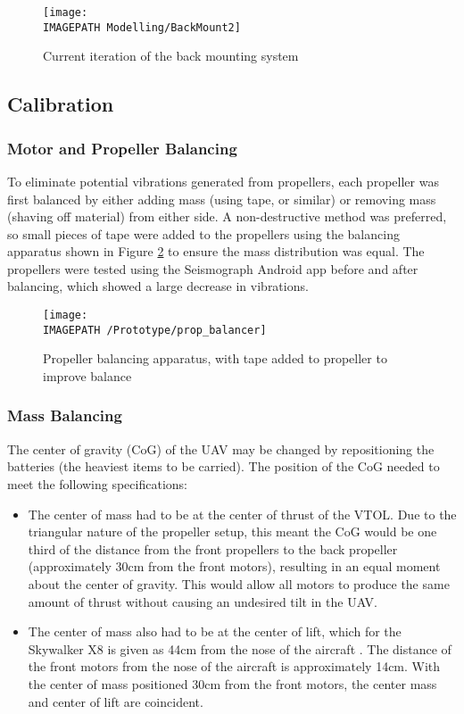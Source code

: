 \begin{figure}[!ht]
	\centering
	\texttt{[image: \\IMAGEPATH Modelling/BackMount2]}
	\caption{Current iteration of the back mounting system}
	\label{fig:designbackmount}
\end{figure}

\subsection{Calibration}
\subsubsection*{Motor and Propeller Balancing}
To eliminate potential vibrations generated from propellers, each propeller was first balanced by either adding mass (using tape, or similar) or removing mass (shaving off material) from either side. A non-destructive method was preferred, so small pieces of tape were added to the propellers using the balancing apparatus shown in Figure \ref{fig:propbalancing} to ensure the mass distribution was equal. The propellers were tested using the Seismograph Android app before and after balancing, which showed a large decrease in vibrations.
\begin{figure}[!ht]
	\centering
	\texttt{[image: \\IMAGEPATH /Prototype/prop\_balancer]}
	\caption{Propeller balancing apparatus, with tape added to propeller to improve balance}
	\label{fig:propbalancing}
\end{figure}

\subsubsection*{Mass Balancing}
The center of gravity (CoG) of the UAV may be changed by repositioning the batteries (the heaviest items to be carried). The position of the CoG needed to meet the following specifications:

\begin{itemize}
	\item The center of mass had to be at the center of thrust of the VTOL. Due to the triangular nature of the propeller setup, this meant the CoG would be one third of the distance from the front propellers to the back propeller (approximately 30cm from the front motors), resulting in an equal moment about the center of gravity. This would allow all motors to produce the same amount of thrust without causing an undesired tilt in the UAV.
	\item The center of mass also had to be at the center of lift, which for the Skywalker X8 is given as 44cm from the nose of the aircraft \cite{ref:x8kit}. The distance of the front motors from the nose of the aircraft is approximately 14cm. With the center of mass positioned 30cm from the front motors, the center mass and center of lift are coincident.
\end{itemize}
	
